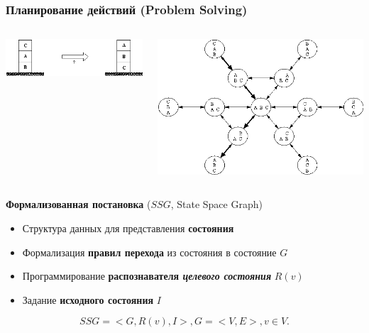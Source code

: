 \documentclass[10pt]{beamer}
\begin{document}
\begin{frame}
  \frametitle{Планирование действий (Problem Solving)}

\begin{columns}
  \begin{column}{0.4\textwidth}
    \includegraphics[width=1\linewidth]{pics/boxes.png}
  \end{column}
  \begin{column}{0.4\textwidth}
    \includegraphics[width=1\linewidth]{pics/boxes-state-space.png}
  \end{column}
\end{columns}
\vfill
\textbf{Формализованная постановка} ($SSG$, State Space Graph)
\begin{itemize}
\item Структура данных для представления \textbf{состояния}
\item Формализация \textbf{правил перехода} из состояния в состояние $G$
\item Программирование \textbf{распознавателя \emph{целевого состояния}} $R(v)$
\item Задание \textbf{исходного состояния} $I$
\end{itemize}
\vspace{1em}
\[
  SSG = <G, R(v), I>, G=<V,E>, v\in V.
\]
\end{frame}
\end{document}
